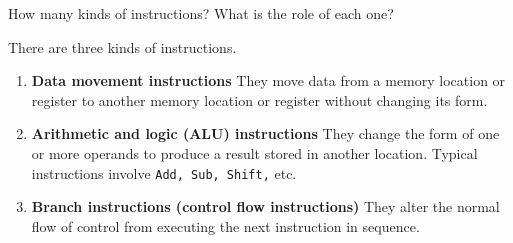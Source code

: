 
\begin{exercise}[]{How many kinds of instructions? What is the role of each one?}
  \begin{solution} There are three kinds of instructions.
  
    \begin{enumerate}
        \item \textbf{Data movement instructions } They move data from a memory location or register to another memory location or register without changing its form.
        \item \textbf{Arithmetic and logic (ALU) instructions } They change the form of one or more operands to produce a result stored in another location. Typical instructions involve \texttt{Add, Sub, Shift,} etc.
        \item \textbf{Branch instructions (control flow instructions) } They alter the normal flow of control from executing the next instruction in sequence.
    \end{enumerate}

\end{solution}
  \label{ex1}
\end{exercise}
    

